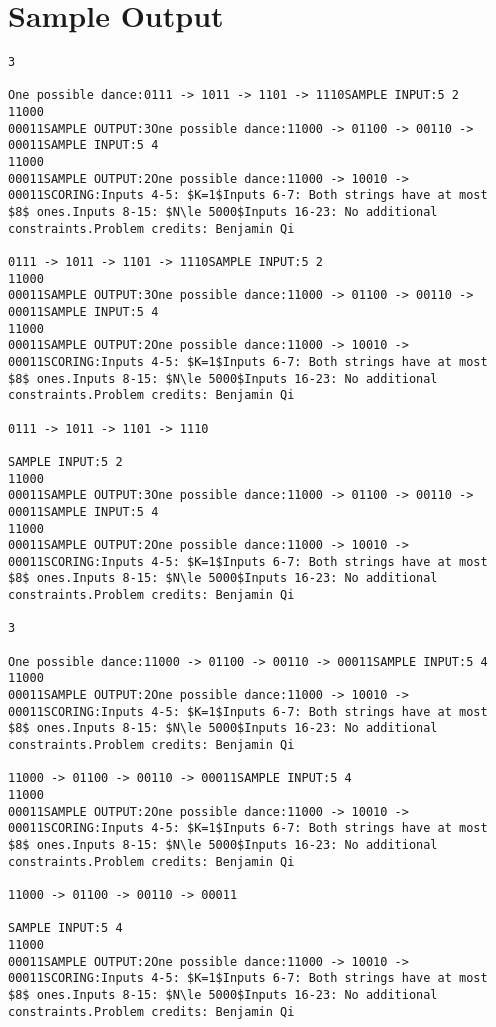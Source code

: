 \documentclass[12pt]{article}
\begin{document}
\section*{Sample Output}
\begin{verbatim}
3

One possible dance:0111 -> 1011 -> 1101 -> 1110SAMPLE INPUT:5 2
11000
00011SAMPLE OUTPUT:3One possible dance:11000 -> 01100 -> 00110 -> 00011SAMPLE INPUT:5 4
11000
00011SAMPLE OUTPUT:2One possible dance:11000 -> 10010 -> 00011SCORING:Inputs 4-5: $K=1$Inputs 6-7: Both strings have at most $8$ ones.Inputs 8-15: $N\le 5000$Inputs 16-23: No additional constraints.Problem credits: Benjamin Qi

0111 -> 1011 -> 1101 -> 1110SAMPLE INPUT:5 2
11000
00011SAMPLE OUTPUT:3One possible dance:11000 -> 01100 -> 00110 -> 00011SAMPLE INPUT:5 4
11000
00011SAMPLE OUTPUT:2One possible dance:11000 -> 10010 -> 00011SCORING:Inputs 4-5: $K=1$Inputs 6-7: Both strings have at most $8$ ones.Inputs 8-15: $N\le 5000$Inputs 16-23: No additional constraints.Problem credits: Benjamin Qi

0111 -> 1011 -> 1101 -> 1110

SAMPLE INPUT:5 2
11000
00011SAMPLE OUTPUT:3One possible dance:11000 -> 01100 -> 00110 -> 00011SAMPLE INPUT:5 4
11000
00011SAMPLE OUTPUT:2One possible dance:11000 -> 10010 -> 00011SCORING:Inputs 4-5: $K=1$Inputs 6-7: Both strings have at most $8$ ones.Inputs 8-15: $N\le 5000$Inputs 16-23: No additional constraints.Problem credits: Benjamin Qi

3

One possible dance:11000 -> 01100 -> 00110 -> 00011SAMPLE INPUT:5 4
11000
00011SAMPLE OUTPUT:2One possible dance:11000 -> 10010 -> 00011SCORING:Inputs 4-5: $K=1$Inputs 6-7: Both strings have at most $8$ ones.Inputs 8-15: $N\le 5000$Inputs 16-23: No additional constraints.Problem credits: Benjamin Qi

11000 -> 01100 -> 00110 -> 00011SAMPLE INPUT:5 4
11000
00011SAMPLE OUTPUT:2One possible dance:11000 -> 10010 -> 00011SCORING:Inputs 4-5: $K=1$Inputs 6-7: Both strings have at most $8$ ones.Inputs 8-15: $N\le 5000$Inputs 16-23: No additional constraints.Problem credits: Benjamin Qi

11000 -> 01100 -> 00110 -> 00011

SAMPLE INPUT:5 4
11000
00011SAMPLE OUTPUT:2One possible dance:11000 -> 10010 -> 00011SCORING:Inputs 4-5: $K=1$Inputs 6-7: Both strings have at most $8$ ones.Inputs 8-15: $N\le 5000$Inputs 16-23: No additional constraints.Problem credits: Benjamin Qi


\end{verbatim}
\end{document}
